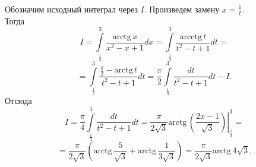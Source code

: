 \documentclass{article}
\begin{document}
Обозначим исходный интеграл через $I$. Произведем замену $x = \frac{1}{t}$.\\
Тогда
$$I = \int\limits_{\frac13}^3 \frac{\textrm{arctg}\, x}{x^2-x+1} dx = \int\limits_{\frac13}^3 \frac{\textrm{arcctg}\, t}{t^2 - t + 1} dt = $$
$$= \int\limits_{\frac13}^3 \frac{\frac{\pi}{2} - \textrm{arctg}\, t}{t^2 - t + 1} dt = \frac{\pi}{2} \int\limits_{\frac13}^3 \frac{dt}{t^2 - t + 1} dt - I.$$
Отсюда
$$I = \frac{\pi}{4} \int\limits_{\frac13}^3 \frac{dt}{t^2 - t + 1} dt = \frac{\pi}{2 \sqrt{3}} \textrm{arctg}\, \left. \left( \frac{2x-1}{\sqrt{3}} \right) \right|_{\frac13}^3 = $$
$$= \frac{\pi}{2\sqrt{3}} \left( \textrm{arctg}\, \frac{5}{\sqrt{3}} + \textrm{arctg}\, \frac{1}{3\sqrt{3}} \right) = \frac{\pi}{2\sqrt{3}} \textrm{arctg}\, 4\sqrt{3}.$$
\end{document}
